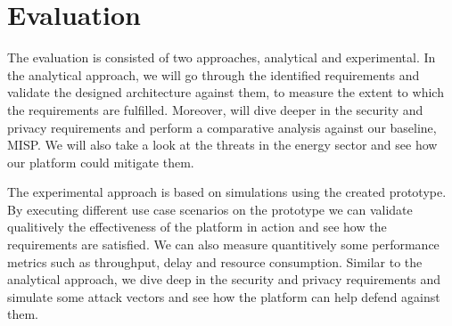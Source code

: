\documentclass{article}
\begin{document}
\section{Evaluation} %
\label{sec:evaluation}


The evaluation is consisted of two approaches, analytical and experimental. In the analytical approach, we will go through the identified requirements and validate the designed architecture against them, to measure the extent to which the requirements are fulfilled. Moreover, will dive deeper in the security and privacy requirements and perform a comparative analysis against our baseline, MISP. We will also take a look at the threats in the energy sector and see how our platform could mitigate them.

The experimental approach is based on simulations using the created prototype. By executing different use case scenarios on the prototype we can validate qualitively the effectiveness of the platform in action and see how the requirements are satisfied. We can also measure quantitively some performance metrics such as throughput, delay and resource consumption. Similar to the analytical approach, we dive deep in the security and privacy requirements and simulate some attack vectors and see how the platform can help defend against them.


\end{document}
